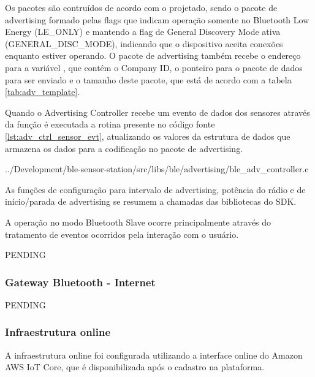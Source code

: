 Os pacotes são contruídos de acordo com o projetado, sendo o pacote de
advertising formado pelas flags que indicam operação somente no Bluetooth Low
Energy (LE\_ONLY) e mantendo a flag de General Discovery Mode ativa
(GENERAL\_DISC\_MODE), indicando que o dispositivo aceita conexões enquanto
estiver operando. O pacote de advertising também recebe o endereço para a
variável , que contém o Company ID, o ponteiro para o
pacote de dados para ser enviado e o tamanho deste pacote, que está de acordo
com a tabela \ref{tab:adv_template}.

Quando o Advertising Controller recebe um evento de dados dos sensores através
da função  é executada a rotina presente no
código fonte \ref{lst:adv_ctrl_sensor_evt}, atualizando os valores da estrutura
de dados que armazena os dados para a codificação no pacote de advertising.

\begin{minipage}{0.95\linewidth} 

{../Development/ble-sensor-station/src/libs/ble/advertising/ble_adv_controller.c}
\end{minipage}

As funções de configuração para intervalo de advertising, potência do rádio e de
início/parada de advertising se resumem a chamadas das bibliotecas do SDK.





A operação no modo Bluetooth Slave ocorre principalmente através do tratamento
de eventos ocorridos pela interação com o usuário.

PENDING


\subsubsection{Gateway Bluetooth - Internet}
PENDING

\subsubsection{Infraestrutura online}

A infraestrutura online foi configurada utilizando a interface online do Amazon
AWS IoT Core, que é disponibilizada após o cadastro na plataforma.

